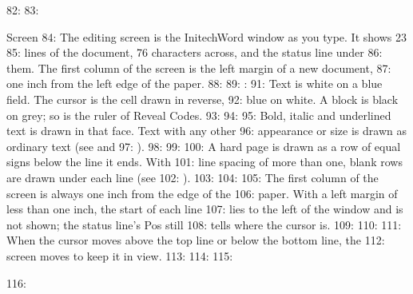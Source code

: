 82: 
83: \begin{Feature}{Screen}
84: The editing screen is the InitechWord window as you type.  It shows 23
85: lines of the document, 76 characters across, and the status line under
86: them.  The first column of the screen is the left margin of a new document,
87: one inch from the left edge of the paper.
88: 
89: : 
91: Text is white on a blue field.  The cursor is the cell drawn in reverse,
92: blue on white.  A block is black on grey; so is the ruler of Reveal Codes.
93: 
94: 
95: Bold, italic and underlined text is drawn in that face.  Text with any other
96: appearance or size is drawn as ordinary text (see  and
97: ).
98: 
99: 
100: A hard page is drawn as a row of equal signs below the line it ends.  With
101: line spacing of more than one, blank rows are drawn under each line (see
102: ).
103: 
104: 
105: The first column of the screen is always one inch from the edge of the
106: paper.  With a left margin of less than one inch, the start of each line
107: lies to the left of the window and is not shown; the status line's Pos still
108: tells where the cursor is.
109: 
110: 
111: When the cursor moves above the top line or below the bottom line, the
112: screen moves to keep it in view.
113: 
114: 
115: \end{Feature}
116: 
